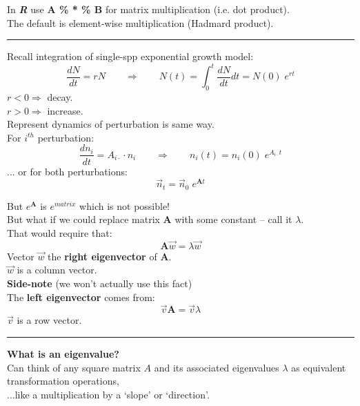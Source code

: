 \documentclass{article}
\newcommand{\note}[1]{\colorbox{gray!30}{#1}}
\newcommand{\ind}{\-\hspace{1cm}}
\begin{document}
\note{In \emph{\textbf{R}} use \textbf{A \% * \% B} for matrix multiplication (i.e. dot product).}\\
\ind \note{The default is element-wise multiplication (Hadmard product).}

\rule[0.5ex]{\linewidth}{1pt}

Recall integration of single-spp exponential growth model:
\begin{equation*}
	\frac{dN}{dt}=rN \quad \quad \Rightarrow \quad \quad N(t) = \int_{0}^{t} \frac{dN}{dt} dt = N(0) \; e^{rt}
\end{equation*}
\ind  $r<0 \Rightarrow$ decay.\\
\ind  $r>0 \Rightarrow$ increase.\\

Represent dynamics of perturbation is same way.\\
\ind For $i^{th}$ perturbation:
\begin{equation*}
	\frac{d n_i}{dt}= A_{i\cdot} \cdot n_i \quad \quad \Rightarrow \quad \quad n_i(t) = n_i(0) \; e^{A_{i \cdot}t}
\end{equation*} 
\ind ... or for both perturbations:
\begin{equation*}
	\vec{n}_t = \vec{n}_0 \; e^{\mathbf{A}t}
\end{equation*}

But $e^\mathbf{A}$ is $e^{matrix}$ which is not possible!\\

But what if we could replace matrix $\mathbf{A}$ with some constant -- call it $\lambda$.\\
That would require that:
\begin{equation*}
	\boxed{\mathbf{A} \vec{w} = \lambda \vec{w}}
\end{equation*}
Vector $\vec{w}$ the \textbf{right eigenvector} of $\mathbf{A}$.\\
\ind $\vec{w}$ is a column vector.\\


\textbf{Side-note} (we won't actually use this fact)\\
\ind The \textbf{left eigenvector} comes from:
\begin{equation*}
	\vec{v}\mathbf{A} = \vec{v}\lambda
\end{equation*}
\ind \ind $\vec{v}$ is a row vector.

\rule[0.5ex]{\linewidth}{1pt}
\pagebreak

\textbf{What is an eigenvalue?}\\
Can think of any square matrix $A$ and its associated eigenvalues $\lambda$ as equivalent transformation operations,\\
\ind ...like a multiplication by a `slope' or `direction'.\\
\end{document}
